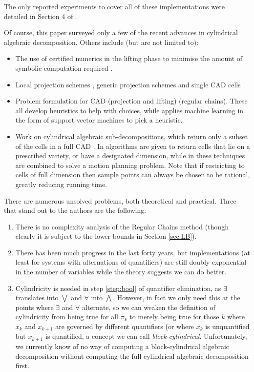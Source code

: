\documentclass[runningheads,a4paper]{llncs}
\begin{document}
\noindent The only reported experiments to cover all of these implementations were detailed in Section 4 of \cite{Bradfordetal2014b}.

Of course, this paper surveyed only a few of the recent advances in cylindrical algebraic decomposition.  Others include (but are not limited to):
\begin{itemize}
\item The use of certified numerics in the lifting phase to minimise the amount of symbolic computation required \cite{Strzebonski2006,IYAY13}.
\item Local projection schemes \cite{Strzebonski2014a}, generic projection schemes \cite{SS03} and single CAD cells \cite{Brown2013,JovanovicdeMoura2012a}.
\item Problem formulation for CAD \cite{Dolzmannetal2004a,Bradfordetal2013a,WEBD14} (projection and lifting) \cite{Englandetal2014c,EBCDMW14} (regular chains).  These all develop heuristics to help with choices, while \cite{Huangetal2014a} applies machine learning in the form of support vector machines to pick a heuristic.
\item Work on cylindrical algebraic sub-decompositions, which return only a subset of the cells in a full CAD \cite{Sei06}.  In \cite{WBDE14} algorithms are given to return cells that lie on a prescribed variety, or have a designated dimension, while in \cite{WDEB13} these techniques are combined to solve a motion planning problem.  Note that if restricting to cells of full dimension then sample points can always be chosen to be rational, greatly reducing running time.
\end{itemize}



There are numerous unsolved problems, both theoretical and practical.  Three that stand out to the authors are the following.
\begin{enumerate}
\item There is no complexity analysis of the Regular Chains method (though clearly it is subject to the lower bounds in Section \ref{sec:LB}).
\item There has been much progress in the last forty years, but implementations (at least for systems with alternations of quantifiers) are still doubly-exponential in the number of variables while the theory suggests we can do better.
\item Cylindricity is needed in step \ref{step:bool} of quantifier elimination, as $\exists$ translates into $\bigvee$ and $\forall$ into $\bigwedge$. However, in fact we only need this at the points where $\exists$ and $\forall$ alternate, so we can weaken the definition of cylindricity from being true for all $\pi_k$ to merely being true for those $k$ where $x_k$ and $x_{k+1}$ are governed by different quantifiers (or where $x_k$ is unquantified but $x_{k+1}$ is quantified, a concept we can call \emph{block-cylindrical}. Unfortunately, we currently know of no way of computing a block-cylindrical algebraic decomposition without computing the full cylindrical algebraic decomposition first.
\end{enumerate}
\end{document}
